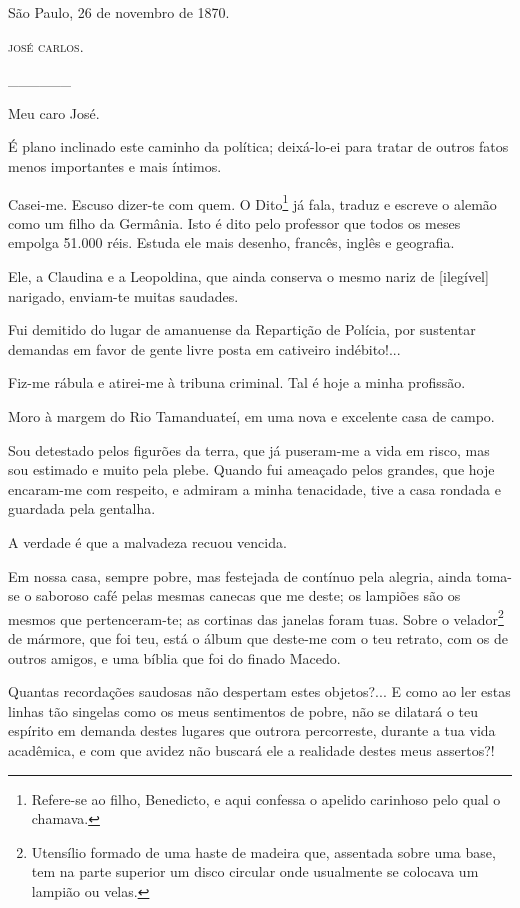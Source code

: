 {\begin{flushright}
São Paulo, 26 de novembro de 1870.

\textsc{josé carlos}.
\end{flushright}

\_\_\_\_\_\_

Meu caro José.

É plano inclinado este caminho da política; deixá-lo-ei para tratar de
outros fatos menos importantes e mais íntimos.

Casei-me. Escuso dizer-te com quem. O {Dito}\footnote{ Refere-se ao
  filho, Benedicto, e aqui confessa o apelido carinhoso pelo qual o
  chamava.} já fala, traduz e escreve o alemão como um filho da
Germânia. Isto é dito pelo professor que todos os meses empolga 51.000
réis. Estuda ele mais desenho, francês, inglês e geografia.

Ele, a Claudina e a Leopoldina, que ainda conserva o mesmo nariz de
{[}ilegível{]} narigado, enviam-te muitas saudades.

Fui demitido do lugar de amanuense da Repartição de Polícia, por
sustentar demandas em favor de gente livre posta em cativeiro
indébito!...

Fiz-me rábula e atirei-me à tribuna criminal. Tal é hoje a minha
profissão.

Moro à margem do Rio Tamanduateí, em uma nova e excelente casa de campo.

Sou detestado pelos figurões da terra, que já puseram-me a vida em
risco, mas sou estimado e muito pela plebe. Quando fui ameaçado pelos
grandes, que hoje encaram-me com respeito, e admiram a minha tenacidade,
tive a casa rondada e guardada pela gentalha.

A verdade é que a malvadeza recuou vencida.

Em nossa casa, sempre pobre, mas festejada de contínuo pela alegria,
ainda toma-se o saboroso café pelas mesmas canecas que me deste; os
lampiões são os mesmos que pertenceram-te; as cortinas das janelas foram
tuas. Sobre o velador\footnote{ Utensílio formado de uma haste de
  madeira que, assentada sobre uma base, tem na parte superior um disco
  circular onde usualmente se colocava um lampião ou velas.} de mármore,
que foi teu, está o álbum que deste-me com o teu retrato, com os de
outros amigos, e uma bíblia que foi do finado Macedo.

Quantas recordações saudosas não despertam estes objetos?... E como ao
ler estas linhas tão singelas como os meus sentimentos de pobre, não se
dilatará o teu espírito em demanda destes lugares que outrora
percorreste, durante a tua vida acadêmica, e com que avidez não buscará
ele a realidade destes meus assertos?!

}
